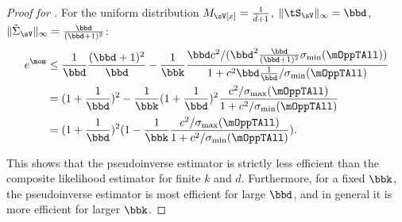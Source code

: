\begin{proof}[Proof for ]
  For the uniform distribution $M_\sV[x] = \frac{1}{\bar d + 1}$,
  $\|\tS_\sV\|_\infty = \bbd$, $\|\tilde
  \Sigma_\sV\|_\infty = \frac{\bbd}{(\bbd + 1)^2}$:
  \begin{align*}
    e^\mom 
    &\le \frac{1}{\bbd} \frac{(\bbd + 1)^2}{\bbd} 
    - \frac{1}{\bbk} \frac{
    \bbd c^2/(\bbd^2 \frac{\bbd}{(\bbd +1)^2} \sigma_{\min}(\mOppTAll))
    }{
    1 + c^2 \bbd \frac{1}{\bbd} / \sigma_{\min}(\mOppTAll)
    } \\
    &= (1 + \frac{1}{\bbd})^2 - \frac{1}{\bbk} (1 + \frac{1}{\bbd})^2 \frac{c^2/\sigma_{\max}(\mOppTAll)}
      {1 + c^2 / \sigma_{\min}(\mOppTAll)} \\
    &= (1 + \frac{1}{\bbd})^2 (1 - \frac{1}{\bbk} \frac{c^2/\sigma_{\max}(\mOppTAll)}{1 + c^2 / \sigma_{\min}(\mOppTAll)}).
  \end{align*}

  This shows that the pseudoinverse estimator is strictly less efficient
  than the composite likelihood estimator for finite $k$ and $d$.
  Furthermore, for a fixed $\bbk$, the pseudoinverse estimator is most
  efficient for large $\bbd$, and in general it is more efficient for
  larger $\bbk$.
\end{proof}

